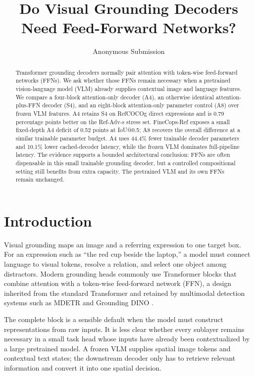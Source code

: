 \documentclass[conference]{IEEEtran}
\title{Do Visual Grounding Decoders Need Feed-Forward Networks?}
\author{Anonymous Submission}
\begin{document}
\maketitle

\begin{abstract}
Transformer grounding decoders normally pair attention with token-wise feed-forward networks (FFNs). We ask whether those FFNs remain necessary when a pretrained vision-language model (VLM) already supplies contextual image and language features. We compare a four-block attention-only decoder (A4), an otherwise identical attention-plus-FFN decoder (S4), and an eight-block attention-only parameter control (A8) over frozen VLM features. A4 retains S4 on RefCOCOg direct expressions and is 0.79 percentage points better on the Ref-Adv-s stress set. FineCops-Ref exposes a small fixed-depth A4 deficit of 0.52 points at IoU@0.5; A8 recovers the overall difference at a similar trainable parameter budget. A4 uses 44.4\% fewer trainable decoder parameters and 10.1\% lower cached-decoder latency, while the frozen VLM dominates full-pipeline latency. The evidence supports a bounded architectural conclusion: FFNs are often dispensable in this small trainable grounding decoder, but a controlled compositional setting still benefits from extra capacity. The pretrained VLM and its own FFNs remain unchanged.
\end{abstract}

\section{Introduction}
Visual grounding maps an image and a referring expression to one target box. For an expression such as ``the red cup beside the laptop,'' a model must connect language to visual tokens, resolve a relation, and select one object among distractors. Modern grounding heads commonly use Transformer blocks that combine attention with a token-wise feed-forward network (FFN), a design inherited from the standard Transformer and retained by multimodal detection systems such as MDETR and Grounding DINO \cite{vaswani2017attention,kamath2021mdetr,liu2024groundingdino}.

The complete block is a sensible default when the model must construct representations from raw inputs. It is less clear whether every sublayer remains necessary in a small task head whose inputs have already been contextualized by a large pretrained model. A frozen VLM supplies spatial image tokens and contextual text states; the downstream decoder only has to retrieve relevant information and convert it into one spatial decision.
\end{document}

